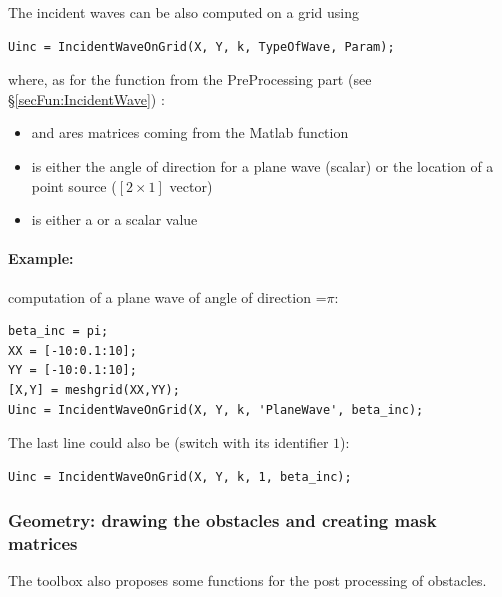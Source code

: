 The incident waves can be also computed on a grid using 
\begin{lstlisting}
Uinc = IncidentWaveOnGrid(X, Y, k, TypeOfWave, Param);
\end{lstlisting}
where, as for the \IncidentWave function from the PreProcessing part (see \S\ref{secFun:IncidentWave}) :
\begin{itemize}
\item {} and  ares matrices coming from the  Matlab function
\item {} is either the angle of direction for a plane wave (scalar) or the location of a point source ($[2\times1]$ vector)
\item {} is either a  or a scalar value 
\end{itemize}
\paragraph{Example:} computation of a plane wave of angle of direction =$\pi$:
\begin{lstlisting}
beta_inc = pi;
XX = [-10:0.1:10];
YY = [-10:0.1:10];
[X,Y] = meshgrid(XX,YY);
Uinc = IncidentWaveOnGrid(X, Y, k, 'PlaneWave', beta_inc);
\end{lstlisting}
The last line could also be (switch  with its identifier $1$):
\begin{lstlisting}
Uinc = IncidentWaveOnGrid(X, Y, k, 1, beta_inc);
\end{lstlisting}

 
\subsubsection{Geometry: drawing the obstacles and creating mask matrices}
\label{secFun:PlotCircles}
\label{secFun:MaskMatrixObstacles}
\label{secFun:BoundaryOfObstacles}


The \mudiff toolbox also proposes some functions for the post processing of obstacles. 
